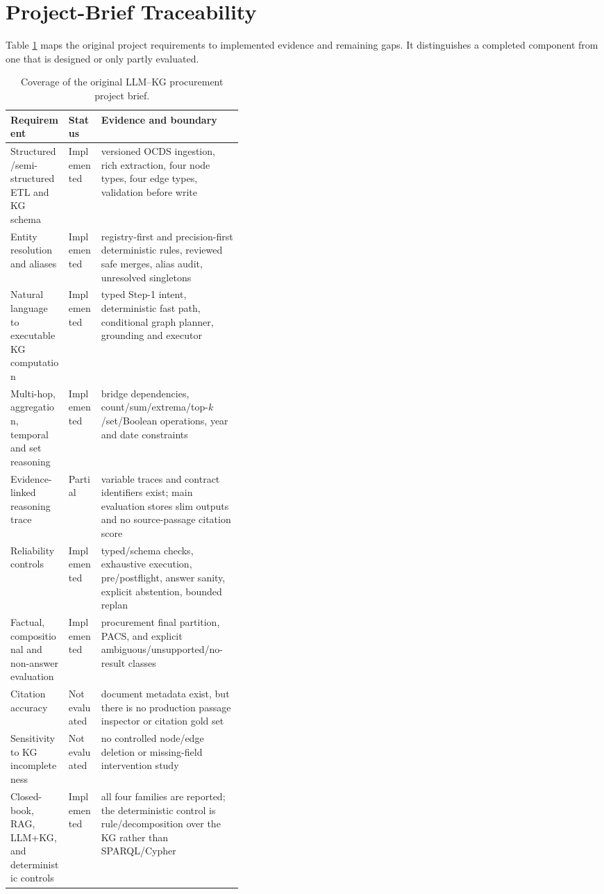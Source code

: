 \section{Project-Brief Traceability}
\label{app:brief}

Table \ref{tab:brief-coverage} maps the original project requirements to implemented evidence and
remaining gaps.  It distinguishes a completed component from one that is designed or only partly
evaluated.

\begin{table}[h]
  \centering
  \caption{Coverage of the original LLM--KG procurement project brief.}
  \label{tab:brief-coverage}
  \small
  \begin{tabularx}{\linewidth}{p{0.25\linewidth}p{0.14\linewidth}X}
    \toprule
    Requirement & Status & Evidence and boundary \\
    \midrule
    Structured/semi-structured ETL and KG schema & Implemented & versioned OCDS ingestion, rich extraction, four node types, four edge types, validation before write \\
    Entity resolution and aliases & Implemented & registry-first and precision-first deterministic rules, reviewed safe merges, alias audit, unresolved singletons \\
    Natural language to executable KG computation & Implemented & typed Step-1 intent, deterministic fast path, conditional graph planner, grounding and executor \\
    Multi-hop, aggregation, temporal and set reasoning & Implemented & bridge dependencies, count/sum/extrema/top-$k$/set/Boolean operations, year and date constraints \\
    Evidence-linked reasoning trace & Partial & variable traces and contract identifiers exist; main evaluation stores slim outputs and no source-passage citation score \\
    Reliability controls & Implemented & typed/schema checks, exhaustive execution, pre/postflight, answer sanity, explicit abstention, bounded replan \\
    Factual, compositional and non-answer evaluation & Implemented & procurement final partition, PACS, and explicit ambiguous/unsupported/no-result classes \\
    Citation accuracy & Not evaluated & document metadata exist, but there is no production passage inspector or citation gold set \\
    Sensitivity to KG incompleteness & Not evaluated & no controlled node/edge deletion or missing-field intervention study \\
    Closed-book, RAG, LLM+KG, and deterministic controls & Implemented & all four families are reported; the deterministic control is rule/decomposition over the KG rather than SPARQL/Cypher \\
    \bottomrule
  \end{tabularx}
\end{table}

